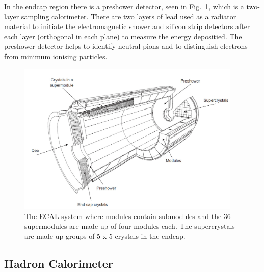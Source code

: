 In the endcap region there is a preshower detector, seen in Fig.~\ref{fig:ecal}, which is a two-layer sampling calorimeter. There are two layers of lead used as a radiator material to initiate the electromagnetic shower and silicon strip detectors after each layer (orthogonal in each plane) to measure the energy depositied. The preshower detector helps to identify neutral pions and to distinguish electrons from minimum ionising particles.

\begin{figure}[ht!]
\centering
    \includegraphics[width=0.95\textwidth]{images/ecal.png}
    \caption{The ECAL system where modules contain submodules and the 36 supermodules are made up of four modules each. The supercrystals are made up groups of 5 x 5 crystals in the endcap.}
    \label{fig:ecal}
\end{figure}

\subsection{Hadron Calorimeter}

